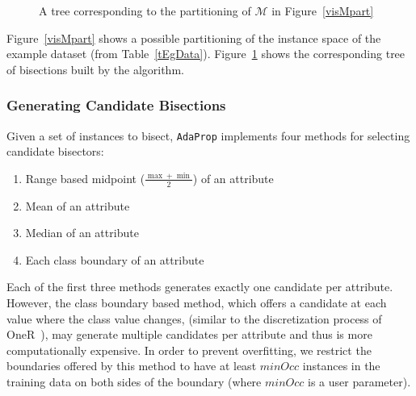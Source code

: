 \documentclass[a4paper,12pt]{article} %
\newcommand{\AdaProp}{\texttt{AdaProp}\xspace}
\newcommand{\mcl}[1]{\mathcal{#1}}
\begin{document}
\begin{figure}
\begin{center}
\end{center}
\caption{A tree corresponding to the partitioning of $\mcl{M}$ in Figure~\ref{visMpart}}
\label{visMTree}
\end{figure}
    
Figure~\ref{visMpart} shows a possible partitioning of 
    the instance space of the example dataset (from Table~\ref{tEgData}).
Figure~\ref{visMTree} shows the corresponding tree of bisections built by
    the algorithm.

\subsubsection{Generating Candidate Bisections}

Given a set of instances to bisect, 
    \AdaProp implements four methods for selecting candidate bisectors:
\begin{enumerate}
\item Range based midpoint ($\frac{\max+\min}{2}$) of an attribute
\item Mean of an attribute
\item Median of an attribute
\item Each class boundary of an attribute 
\end{enumerate}

Each of the first three methods generates exactly one candidate per attribute.
However, the class boundary based method, 
    which offers a candidate at each value where the class value changes,
    (similar to the discretization process of OneR~\cite{holte}), 
    may generate multiple candidates per attribute and 
    thus is more computationally expensive.
In order to prevent overfitting, 
    we restrict the boundaries offered by this method to have at least $minOcc$ instances
    in the training data on both sides of the boundary 
    (where $minOcc$ is a user parameter).
\end{document}
